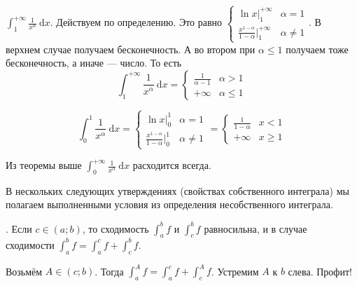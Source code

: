 \documentclass{article}
\begin{document}
\begin{itemize}
\begin{Comment}
        \end{Comment}
        \pagebreak
        \begin{Example}
            $\int_1^{+\infty}\frac1{x^\alpha}~\mathrm dx$. Действуем по определению. Это равно $\begin{cases}
                \ln x\big|_1^{+\infty} & \alpha=1\\
                \frac{x^{1-\alpha}}{1-\alpha}\big|_1^{+\infty} & \alpha\neq1
            \end{cases}$. В верхнем случае получаем бесконечность. А во втором при $\alpha\leqslant1$ получаем тоже бесконечность, а иначе --- число. То есть
            $$\int_1^{+\infty}\frac1{x^\alpha}~\mathrm dx=\begin{cases}
                \frac1{\alpha-1} & \alpha>1\\
                +\infty & \alpha\leqslant1
            \end{cases}$$
        \end{Example}
        \begin{Example}
            $$\int_0^1\frac1{x^\alpha}~\mathrm dx=\begin{cases}
                \ln x\big|_0^1 & \alpha=1\\
                \frac{x^{1-\alpha}}{1-\alpha}\big|_0^1 & \alpha\neq1
            \end{cases}=\begin{cases}
                \frac1{1-\alpha} & x<1\\
                +\infty & x\geqslant1
            \end{cases}$$
        \end{Example}
        \begin{Example}
            Из теоремы выше $\int_0^{+\infty}\frac1{x^\alpha}~\mathrm dx$ расходится всегда.
        \end{Example}
        \begin{Comment}
            В нескольких следующих утверждениях (свойствах собственного интеграла) мы полагаем выполненными условия из определения несобственного интеграла.
        \end{Comment}
        \thm {}. Если $c\in(a;b)$, то сходимость $\int_a^bf$ и $\int_c^bf$ равносильна, и в случае сходимости $\int_a^bf=\int_a^cf+\int_c^bf$.
        \begin{Proof}
            Возьмём $A\in(c;b)$. Тогда $\int_a^Af=\int_a^cf+\int_c^Af$. Устремим $A$ к $b$ слева. Профит!
        \end{Proof}

\end{itemize}
\end{document}
